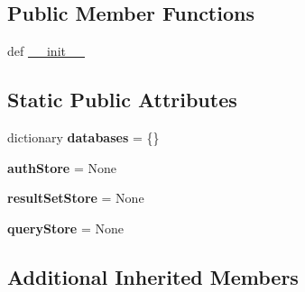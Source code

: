 \subsection*{Public Member Functions}
\begin{DoxyCompactItemize}
\item 
def \hyperlink{classcheshire3_1_1base_objects_1_1_server_ae5db1b85db8cfda64cdc3cd2855407ba}{\-\_\-\-\_\-init\-\_\-\-\_\-}
\end{DoxyCompactItemize}
\subsection*{Static Public Attributes}
\begin{DoxyCompactItemize}
\item 
\hypertarget{classcheshire3_1_1base_objects_1_1_server_a7734204562e6533ac74fb4aabf1fbf76}{dictionary {\bfseries databases} = \{\}}\label{classcheshire3_1_1base_objects_1_1_server_a7734204562e6533ac74fb4aabf1fbf76}

\item 
\hypertarget{classcheshire3_1_1base_objects_1_1_server_a5f4242735e4552fcbcaa384f7a735a7f}{{\bfseries auth\-Store} = None}\label{classcheshire3_1_1base_objects_1_1_server_a5f4242735e4552fcbcaa384f7a735a7f}

\item 
\hypertarget{classcheshire3_1_1base_objects_1_1_server_a230fba314a1a221f7b9bf4809ea90de7}{{\bfseries result\-Set\-Store} = None}\label{classcheshire3_1_1base_objects_1_1_server_a230fba314a1a221f7b9bf4809ea90de7}

\item 
\hypertarget{classcheshire3_1_1base_objects_1_1_server_a9dd702605170183b5b6e6cb33f075aa6}{{\bfseries query\-Store} = None}\label{classcheshire3_1_1base_objects_1_1_server_a9dd702605170183b5b6e6cb33f075aa6}

\end{DoxyCompactItemize}
\subsection*{Additional Inherited Members}



